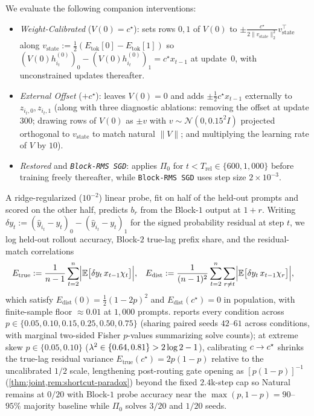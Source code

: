 We evaluate the following companion interventions:
\begin{itemize}[leftmargin=*]
\item \emph{Weight-Calibrated} ($V(0)=c^\star$): sets rows $0,1$ of $V(0)$ to $\pm \frac{c^\star}{2\|v_{\mathrm{state}}\|_2^2} v_{\mathrm{state}}^\top$ along $v_{\mathrm{state}} := \frac{1}{2}(E_{\mathrm{tok}}[0] - E_{\mathrm{tok}}[1])$ so $(V(0)h_{i_t}^{(0)})_0 - (V(0)h_{i_t}^{(0)})_1 = c^\star x_{t-1}$ at update~$0$, with unconstrained updates thereafter.
\item \emph{External Offset} ($+c^\star$): leaves $V(0)=0$ and adds $\pm \frac{1}{2}c^\star x_{t-1}$ externally to $z_{i_t,0}, z_{i_t,1}$ (along with three diagnostic ablations: removing the offset at update $300$; drawing rows of $V(0)$ as $\pm v$ with $v \sim \mathcal N(0, 0.15^2 I)$ projected orthogonal to $v_{\mathrm{state}}$ to match natural $\|V\|$; and multiplying the learning rate of $V$ by $10$).
\item \emph{Restored} and \emph{\texttt{Block-RMS SGD}}: applies $\Pi_0$ for $t < T_{\mathrm{rel}} \in \{600, 1{,}000\}$ before training freely thereafter, while \texttt{Block-RMS SGD} uses step size $2\times 10^{-3}$.
\end{itemize}

A ridge-regularized ($10^{-2}$) linear probe, fit on half of the held-out prompts and scored on the other half, predicts $b_r$ from the Block-$1$ output at $1+r$. Writing $\delta y_t := (\hat y_{i_t} - y_t)_0 - (\hat y_{i_t} - y_t)_1$ for the signed probability residual at step $t$, we log held-out rollout accuracy, Block-$2$ true-lag prefix share, and the residual-match correlations
\begin{align*}
  E_{\mathrm{true}} &:= \frac{1}{n-1}\sum_{t=2}^n \Bigl|\mathbb E\bigl[\delta y_t\,x_{t-1}\chi_t\bigr]\Bigr|, &
  E_{\mathrm{dist}} &:= \frac{1}{(n-1)^2}\sum_{t=2}^n\sum_{r\ne t}\Bigl|\mathbb E\bigl[\delta y_t\,x_{t-1}\chi_r\bigr]\Bigr|,
\end{align*}
which satisfy $E_{\mathrm{dist}}(0) = \frac{1}{2}(1-2p)^2$ and $E_{\mathrm{dist}}(c^\star) = 0$ in population, with finite-sample floor $\approx 0.01$ at $1{,}000$ prompts.  reports every condition across $p \in \{0.05, 0.10, 0.15, 0.25, 0.50, 0.75\}$ (sharing paired seeds $42$--$61$ across conditions, with marginal two-sided Fisher $p$-values summarizing solve counts); at extreme skew $p \in \{0.05, 0.10\}$ ($\lambda^2 \in \{0.64, 0.81\} > 2\log 2 - 1$), calibrating $c \to c^\star$ shrinks the true-lag residual variance $E_{\mathrm{true}}(c^\star) = 2p(1-p)$ relative to the uncalibrated $1/2$ scale, lengthening post-routing gate opening as $[p(1-p)]^{-1}$ (\cref{thm:joint,rem:shortcut-paradox}) beyond the fixed $2.4$k-step cap so Natural remains at $0/20$ with Block-$1$ probe accuracy near the $\max(p, 1-p) = 90$--$95\%$ majority baseline while $\Pi_0$ solves $3/20$ and $1/20$ seeds.

